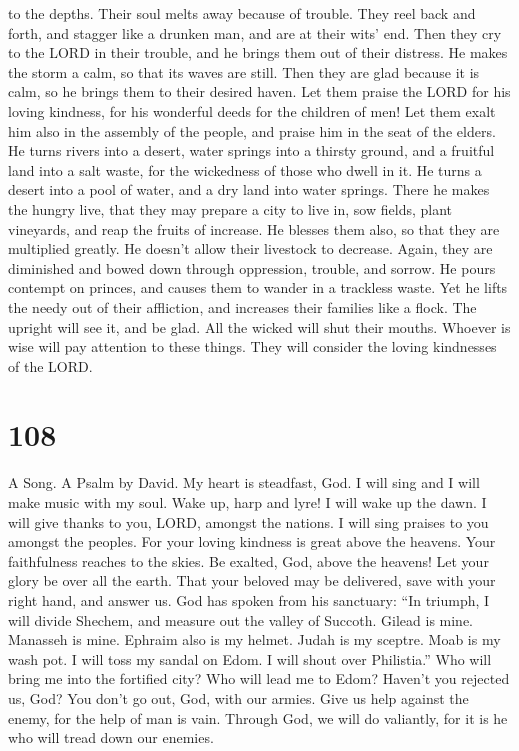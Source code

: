 to the depths. Their soul melts away because of trouble. 
They reel back and forth, and stagger like a drunken man, and are at
their wits' end.  Then they cry to the LORD in their
trouble, and he brings them out of their distress.  He
makes the storm a calm, so that its waves are still.  Then
they are glad because it is calm, so he brings them to their desired
haven.  Let them praise the LORD for his loving kindness,
for his wonderful deeds for the children of men!  Let them
exalt him also in the assembly of the people, and praise him in the seat
of the elders.  He turns rivers into a desert, water
springs into a thirsty ground,  and a fruitful land into a
salt waste, for the wickedness of those who dwell in it. 
He turns a desert into a pool of water, and a dry land into water
springs.  There he makes the hungry live, that they may
prepare a city to live in,  sow fields, plant vineyards,
and reap the fruits of increase.  He blesses them also, so
that they are multiplied greatly. He doesn't allow their livestock to
decrease.  Again, they are diminished and bowed down
through oppression, trouble, and sorrow.  He pours contempt
on princes, and causes them to wander in a trackless waste.
 Yet he lifts the needy out of their affliction, and
increases their families like a flock.  The upright will
see it, and be glad. All the wicked will shut their mouths.
 Whoever is wise will pay attention to these things. They
will consider the loving kindnesses of the LORD.

\hypertarget{section-98}{%
\section{108}\label{section-98}}

A Song. A Psalm by David.  My heart is steadfast, God. I
will sing and I will make music with my soul.  Wake up, harp
and lyre! I will wake up the dawn.  I will give thanks to
you, LORD, amongst the nations. I will sing praises to you amongst the
peoples.  For your loving kindness is great above the
heavens. Your faithfulness reaches to the skies.  Be
exalted, God, above the heavens! Let your glory be over all the earth.
 That your beloved may be delivered, save with your right
hand, and answer us.  God has spoken from his sanctuary:
``In triumph, I will divide Shechem, and measure out the valley of
Succoth.  Gilead is mine. Manasseh is mine. Ephraim also is
my helmet. Judah is my sceptre.  Moab is my wash pot. I will
toss my sandal on Edom. I will shout over Philistia.''  Who
will bring me into the fortified city? Who will lead me to Edom?
 Haven't you rejected us, God? You don't go out, God, with
our armies.  Give us help against the enemy, for the help
of man is vain.  Through God, we will do valiantly, for it
is he who will tread down our enemies.

